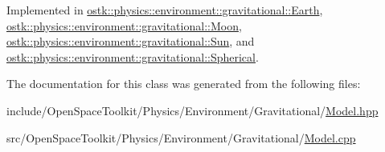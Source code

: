 Implemented in \hyperlink{classostk_1_1physics_1_1environment_1_1gravitational_1_1_earth_a9e536649566761f4bdd467993abfcedd}{ostk\+::physics\+::environment\+::gravitational\+::\+Earth}, \hyperlink{classostk_1_1physics_1_1environment_1_1gravitational_1_1_moon_a4771ff76d04a7f850b1bd29b146696ae}{ostk\+::physics\+::environment\+::gravitational\+::\+Moon}, \hyperlink{classostk_1_1physics_1_1environment_1_1gravitational_1_1_sun_ac8aac491e31bde1690f5d85c7c5fe590}{ostk\+::physics\+::environment\+::gravitational\+::\+Sun}, and \hyperlink{classostk_1_1physics_1_1environment_1_1gravitational_1_1_spherical_a37243cf671418b0cb9eff229101b5e96}{ostk\+::physics\+::environment\+::gravitational\+::\+Spherical}.



The documentation for this class was generated from the following files\+:\begin{DoxyCompactItemize}
\item 
include/\+Open\+Space\+Toolkit/\+Physics/\+Environment/\+Gravitational/\hyperlink{_gravitational_2_model_8hpp}{Model.\+hpp}\item 
src/\+Open\+Space\+Toolkit/\+Physics/\+Environment/\+Gravitational/\hyperlink{_gravitational_2_model_8cpp}{Model.\+cpp}\end{DoxyCompactItemize}
